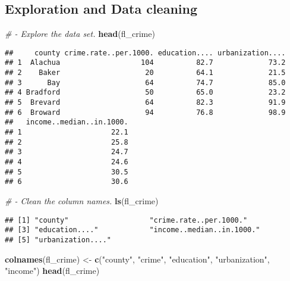 \documentclass[
]{article}
\newenvironment{Shaded}{\begin{snugshade}}{\end{snugshade}}
\newcommand{\CommentTok}[1]{\textcolor[rgb]{0.56,0.35,0.01}{\textit{#1}}}
\newcommand{\KeywordTok}[1]{\textcolor[rgb]{0.13,0.29,0.53}{\textbf{#1}}}
\newcommand{\NormalTok}[1]{#1}
\newcommand{\StringTok}[1]{\textcolor[rgb]{0.31,0.60,0.02}{#1}}
\begin{document}
\hypertarget{exploration-and-data-cleaning}{%
\subsection{Exploration and Data
cleaning}\label{exploration-and-data-cleaning}}

\begin{Shaded}
\begin{Highlighting}[]
\CommentTok{# - Explore the data set.}
\KeywordTok{head}\NormalTok{(fl_crime)}
\end{Highlighting}
\end{Shaded}

\begin{verbatim}
##     county crime.rate..per.1000. education.... urbanization....
## 1  Alachua                   104          82.7             73.2
## 2    Baker                    20          64.1             21.5
## 3      Bay                    64          74.7             85.0
## 4 Bradford                    50          65.0             23.2
## 5  Brevard                    64          82.3             91.9
## 6  Broward                    94          76.8             98.9
##   income..median..in.1000.
## 1                     22.1
## 2                     25.8
## 3                     24.7
## 4                     24.6
## 5                     30.5
## 6                     30.6
\end{verbatim}

\begin{Shaded}
\begin{Highlighting}[]
\CommentTok{# - Clean the column names.}
\KeywordTok{ls}\NormalTok{(fl_crime)}
\end{Highlighting}
\end{Shaded}

\begin{verbatim}
## [1] "county"                   "crime.rate..per.1000."   
## [3] "education...."            "income..median..in.1000."
## [5] "urbanization...."
\end{verbatim}

\begin{Shaded}
\begin{Highlighting}[]
\KeywordTok{colnames}\NormalTok{(fl_crime) <-}\StringTok{ }\KeywordTok{c}\NormalTok{(}\StringTok{"county"}\NormalTok{, }\StringTok{"crime"}\NormalTok{, }\StringTok{"education"}\NormalTok{, }\StringTok{"urbanization"}\NormalTok{, }\StringTok{"income"}\NormalTok{)}
\KeywordTok{head}\NormalTok{(fl_crime)}
\end{Highlighting}
\end{Shaded}
\end{document}
